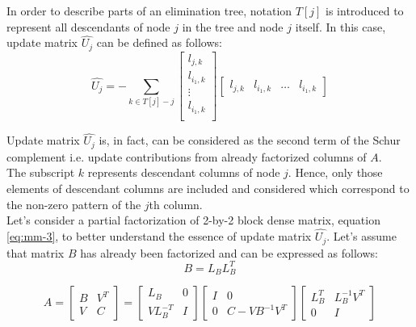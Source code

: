 In order to describe parts of an elimination tree, notation $T[j]$ is introduced to represent all descendants of node $j$ in the tree and node $j$ itself. In this case, update matrix $\hat{U_{j}}$ can be defined as follows:\\

\begin{equation} \label{eq:mm-2}
	\hat{U_{j}} = - \sum_{k \in T[j] -{j}}  \begin{bmatrix}
l_{j,k} \\
l_{i_1,k} \\
\vdots \\
l_{i_1,k} \\
\end{bmatrix} \begin{bmatrix}
l_{j,k} & l_{i_1,k} & \dots & l_{i_1,k}
\end{bmatrix} 
\end{equation}


Update matrix $\hat{U_{j}}$ is, in fact, can be considered as the second term of the Schur complement i.e. update contributions from already factorized columns of $A$.\\

The subscript $k$ represents descendant columns of node $j$. Hence, only those elements of descendant columns are included and considered which correspond to the non-zero pattern of the $j$th column.\\

Let's consider a partial factorization of 2-by-2 block dense matrix, equation \ref{eq:mm-3}, to better understand the essence of update matrix $\hat{U_{j}}$. Let's assume that  matrix $B$ has already been factorized and can be expressed as follows: \\


\begin{equation} \label{eq:mm-4}
	B = L_{B}L^{T}_{B}
\end{equation}


\begin{equation} \label{eq:mm-3}
A = \begin{bmatrix}
B & V^{T} \\
V & C
\end{bmatrix} 
= 
\begin{bmatrix}
L_{B} & 0 \\
VL^{-T}_{B} & I
\end{bmatrix}
\begin{bmatrix}
I & 0 \\
0 & C - VB^{-1}V^{T}
\end{bmatrix} 
\begin{bmatrix}
L^{T}_{B} & L^{-1}_{B}V^{T} \\
0 & I
\end{bmatrix} 
\end{equation}


